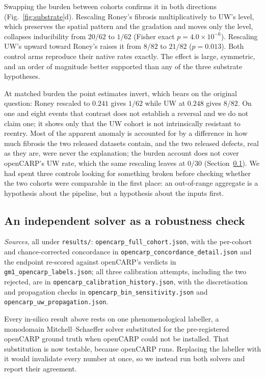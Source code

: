\documentclass[11pt]{article}
\theoremstyle{definition}
\newcommand{\code}[1]{\texttt{#1}}
\begin{document}
Swapping the burden between cohorts confirms it in both directions
(Fig.~\ref{fig:substrate}d). Rescaling Roney's fibrosis multiplicatively to UW's
level, which preserves the spatial pattern and the gradation and moves only the
level, collapses inducibility from $20/62$ to $1/62$ (Fisher exact
$p=4.0\times10^{-6}$). Rescaling UW's upward toward Roney's raises it from
$8/82$ to $21/82$ ($p=0.013$). Both control arms reproduce their native rates
exactly. The effect is large, symmetric, and an order of magnitude better
supported than any of the three substrate hypotheses.

At matched burden the point estimates invert, which bears on the original
question: Roney rescaled to $0.241$ gives $1/62$ while UW at $0.248$ gives
$8/82$. On one and eight events that contrast does not establish a reversal and
we do not claim one; it shows only that the UW cohort is not intrinsically
resistant to reentry. Most of the apparent anomaly is accounted for by a
difference in how much fibrosis the two released datasets contain, and the two
released defects, real as they are, were never the explanation; the burden
account does not cover openCARP's UW rate, which the same rescaling leaves at
$0/30$ (Section~\ref{sec:opencarp}). We had spent three controls looking for
something broken before checking whether the two cohorts were comparable in the
first place: an out-of-range aggregate is a hypothesis about the pipeline, but a
hypothesis about the inputs first.

\subsection{An independent solver as a robustness check}
\label{sec:opencarp}
\noindent\emph{Sources}, all under \code{results/}:
\code{opencarp\allowbreak\_full\allowbreak\_cohort.json}, with the
per-cohort and chance-corrected concordance in
\code{opencarp\allowbreak\_concordance\allowbreak\_detail.json} and the endpoint
re-scored against openCARP's verdicts in
\code{gm1\allowbreak\_opencarp\allowbreak\_labels.json};
all three calibration attempts, including the two rejected, are in
\code{opencarp\allowbreak\_calibration\allowbreak\_history.json},
with the discretisation and propagation checks in
\code{opencarp\allowbreak\_bin\allowbreak\_sensitivity.json} and
\code{opencarp\allowbreak\_uw\allowbreak\_propagation.json}.

Every in-silico result above rests on one phenomenological labeller, a monodomain
Mitchell--Schaeffer solver substituted for the pre-registered openCARP ground
truth when openCARP could not be installed. That substitution is now testable,
because openCARP runs. Replacing the labeller with it would invalidate every
number at once, so we instead run both solvers and report their agreement.
\end{document}
